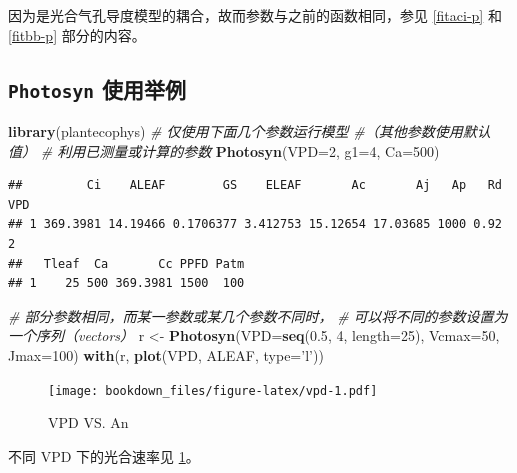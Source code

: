 \documentclass[
]{krantz}
\makeatletter
\newenvironment{Shaded}{\begin{snugshade}}{\end{snugshade}}
\newcommand{\CommentTok}[1]{\textcolor[rgb]{0.56,0.35,0.01}{\textit{#1}}}
\newcommand{\DataTypeTok}[1]{\textcolor[rgb]{0.13,0.29,0.53}{#1}}
\newcommand{\DecValTok}[1]{\textcolor[rgb]{0.00,0.00,0.81}{#1}}
\newcommand{\FloatTok}[1]{\textcolor[rgb]{0.00,0.00,0.81}{#1}}
\newcommand{\KeywordTok}[1]{\textcolor[rgb]{0.13,0.29,0.53}{\textbf{#1}}}
\newcommand{\NormalTok}[1]{#1}
\newcommand{\StringTok}[1]{\textcolor[rgb]{0.31,0.60,0.02}{#1}}
\newenvironment{kframe}{%
\medskip{}
\setlength{\fboxsep}{.8em}
 \def\at@end@of@kframe{}%
 \ifinner\ifhmode%
  \def\at@end@of@kframe{\end{minipage}}%
  \begin{minipage}{\columnwidth}%
 \fi\fi%
 \def\FrameCommand##1{\hskip\@totalleftmargin \hskip-\fboxsep
 \colorbox{shadecolor}{##1}\hskip-\fboxsep
     \hskip-\linewidth \hskip-\@totalleftmargin \hskip\columnwidth}%
 \MakeFramed {\advance\hsize-\width
   \@totalleftmargin\z@ \linewidth\hsize
   \@setminipage}}%
 {\par\unskip\endMakeFramed%
 \at@end@of@kframe}
\renewenvironment{Shaded}{\begin{kframe}}{\end{kframe}}
\makeatother
\begin{document}
因为是光合气孔导度模型的耦合，故而参数与之前的函数相同，参见 \ref{fitaci-p} 和 \ref{fitbb-p} 部分的内容。

\hypertarget{photo_exam}{%
\subsection{\texorpdfstring{\texttt{Photosyn} 使用举例}{Photosyn 使用举例}}\label{photo_exam}}

\begin{Shaded}
\begin{Highlighting}[]
\KeywordTok{library}\NormalTok{(plantecophys)}
\CommentTok{# 仅使用下面几个参数运行模型}
\CommentTok{#（其他参数使用默认值）}
\CommentTok{# 利用已测量或计算的参数}
\KeywordTok{Photosyn}\NormalTok{(}\DataTypeTok{VPD=}\DecValTok{2}\NormalTok{, }\DataTypeTok{g1=}\DecValTok{4}\NormalTok{, }\DataTypeTok{Ca=}\DecValTok{500}\NormalTok{)}
\end{Highlighting}
\end{Shaded}

\begin{verbatim}
##         Ci    ALEAF        GS    ELEAF       Ac       Aj   Ap   Rd VPD
## 1 369.3981 14.19466 0.1706377 3.412753 15.12654 17.03685 1000 0.92   2
##   Tleaf  Ca       Cc PPFD Patm
## 1    25 500 369.3981 1500  100
\end{verbatim}

\begin{Shaded}
\begin{Highlighting}[]
\CommentTok{# 部分参数相同，而某一参数或某几个参数不同时，}
\CommentTok{# 可以将不同的参数设置为一个序列（vectors）}
\NormalTok{r <-}\StringTok{ }\KeywordTok{Photosyn}\NormalTok{(}\DataTypeTok{VPD=}\KeywordTok{seq}\NormalTok{(}\FloatTok{0.5}\NormalTok{, }\DecValTok{4}\NormalTok{, }\DataTypeTok{length=}\DecValTok{25}\NormalTok{), }
              \DataTypeTok{Vcmax=}\DecValTok{50}\NormalTok{, }\DataTypeTok{Jmax=}\DecValTok{100}\NormalTok{)}
\KeywordTok{with}\NormalTok{(r, }\KeywordTok{plot}\NormalTok{(VPD, ALEAF, }\DataTypeTok{type=}\StringTok{'l'}\NormalTok{))}
\end{Highlighting}
\end{Shaded}

\begin{figure}
\centering
\texttt{[image: bookdown\_files/figure-latex/vpd-1.pdf]}
\caption{\label{fig:vpd}VPD VS. An}
\end{figure}

不同 VPD 下的光合速率见 \ref{fig:vpd}。
\end{document}
